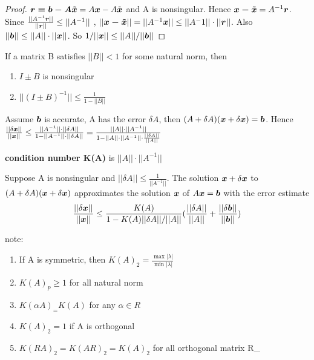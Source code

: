 \documentclass[11pt]{article}
\begin{document}
\begin{proof}
$\boldsymbol{r=b-A\tilde{x}}=A\boldsymbol{x}-A\tilde{\boldsymbol{x}}$ and A is nonsingular. Hence 
$\boldsymbol{x-\tilde{x}}=A^{-1}\boldsymbol{r}$. Since $\frac{||A^{-1}\boldsymbol{r}||}{||\boldsymbol{r}||}\le||A^{-1}||$
, $||\boldsymbol{x-\tilde{x}}||=||A^{-1}\boldsymbol{x}||\le||A^-1||\cdot||\boldsymbol{r}||$. Also
$||\boldsymbol{b}||\le||A||\cdot||\boldsymbol{x}||$. So $1/||\boldsymbol{x}||\le||A||/||\boldsymbol{b}||$
\end{proof}

\begin{theorem}
If a matrix B satisfies $||B||<1$ for some natural norm, then
\begin{enumerate}
\item $I\pm B$ is nonsingular
\item $||(I\pm B)^{-1}||\le \frac{1}{1-||B||}$
\end{enumerate}
\end{theorem}

Assume \(\boldsymbol{b}\) is accurate, A has the error \(\delta A\), then
\((A+\delta A)(\boldsymbol{x}+\delta\boldsymbol{x})=\boldsymbol{b}\). Hence
\(\frac{||\delta\boldsymbol{x}||}{||\boldsymbol{x}||}\le \frac{||A^{-1}||\cdot||\delta
   A||}{1-||A^{-1}||\cdot||\delta A||}=\frac{||A||\cdot||A^{-1}||}{1
   -||A||\cdot||A^{-1}||\cdot \frac{||\delta A||}{||A||}}\)

\textbf{condition number K(A)} is \(||A||\cdot||A^{-1}||\)

\begin{theorem}
Suppose A is nonsingular and $||\delta A||\le \frac{1}{||A^{-1}||}$. The solution
$\boldsymbol{x}+\delta\boldsymbol{x}$ to $(A+\delta A)(\boldsymbol{x}+\delta\boldsymbol{x})$ approximates the solution
$\boldsymbol{x}$ of $A\boldsymbol{x}=\boldsymbol{b}$ with the error estimate
\begin{equation*}
\frac{||\delta\boldsymbol{x}||}{||\boldsymbol{x}||}\le \frac{K(A)}{1-K(A)||\delta A||/||A||}
(\frac{||\delta A||}{||A||}+ \frac{||\delta\boldsymbol{b}||}{||\boldsymbol{b}||})
\end{equation*}
\end{theorem}

note:
\begin{enumerate}
\item If A is symmetric, then \(K(A)_2= \frac{\max|\lambda|}{\min|\lambda|}\)
\item \(K(A)_p\ge1\) for all natural norm
\item \(K(\alpha A)_=K(A)\) for any \(\alpha\in R\)
\item \(K(A)_2=1\) if A is orthogonal
\item \(K(RA)_2=K(AR)_2=K(A)_2\) for all orthogonal matrix R\_
\end{enumerate}
\end{document}
